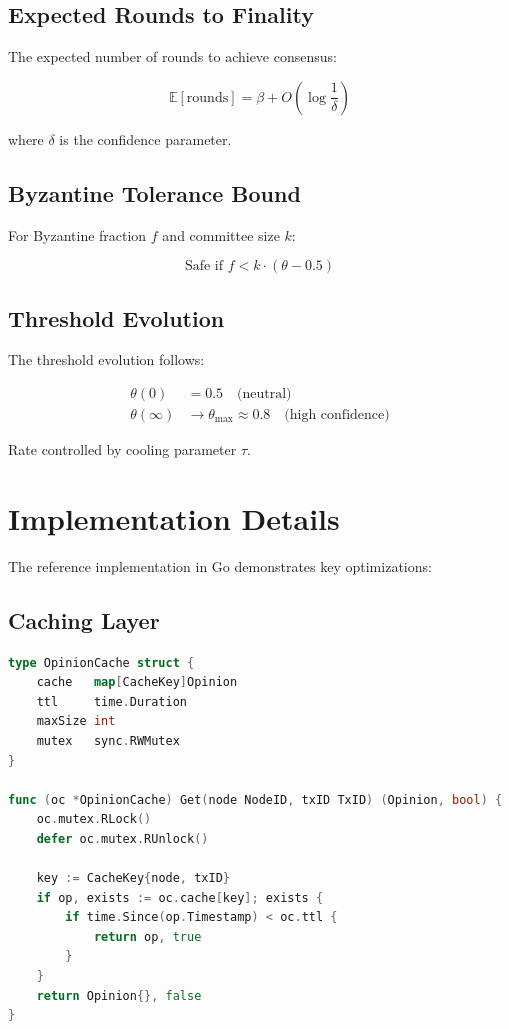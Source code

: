 \documentclass[11pt,a4paper]{article}
\begin{document}
\subsection{Expected Rounds to Finality}

The expected number of rounds to achieve consensus:

\begin{equation}
\mathbb{E}[\text{rounds}] = \beta + O\left(\log\frac{1}{\delta}\right)
\end{equation}

where $\delta$ is the confidence parameter.

\subsection{Byzantine Tolerance Bound}

For Byzantine fraction $f$ and committee size $k$:

\begin{equation}
\text{Safe if } f < k \cdot (\theta - 0.5)
\end{equation}

\subsection{Threshold Evolution}

The threshold evolution follows:

\begin{align}
\theta(0) &= 0.5 \quad \text{(neutral)} \\
\theta(\infty) &\to \theta_{\max} \approx 0.8 \quad \text{(high confidence)}
\end{align}

Rate controlled by cooling parameter $\tau$.

\section{Implementation Details}
\label{sec:implementation}

The reference implementation in Go demonstrates key optimizations:

\subsection{Caching Layer}

\begin{lstlisting}[language=Go, caption=Opinion caching for performance]
type OpinionCache struct {
    cache   map[CacheKey]Opinion
    ttl     time.Duration
    maxSize int
    mutex   sync.RWMutex
}

func (oc *OpinionCache) Get(node NodeID, txID TxID) (Opinion, bool) {
    oc.mutex.RLock()
    defer oc.mutex.RUnlock()
    
    key := CacheKey{node, txID}
    if op, exists := oc.cache[key]; exists {
        if time.Since(op.Timestamp) < oc.ttl {
            return op, true
        }
    }
    return Opinion{}, false
}
\end{lstlisting}
\end{document}
